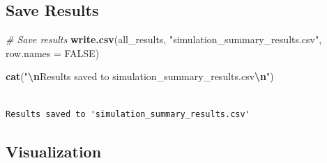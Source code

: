\documentclass[
  letterpaper,
  DIV=11,
  numbers=noendperiod]{scrartcl}
\newenvironment{Shaded}{\begin{snugshade}}{\end{snugshade}}
\newcommand{\AttributeTok}[1]{\textcolor[rgb]{0.13,0.29,0.53}{#1}}
\newcommand{\CommentTok}[1]{\textcolor[rgb]{0.56,0.35,0.01}{\textit{#1}}}
\newcommand{\ConstantTok}[1]{\textcolor[rgb]{0.56,0.35,0.01}{#1}}
\newcommand{\FunctionTok}[1]{\textcolor[rgb]{0.13,0.29,0.53}{\textbf{#1}}}
\newcommand{\NormalTok}[1]{#1}
\newcommand{\OtherTok}[1]{\textcolor[rgb]{0.56,0.35,0.01}{#1}}
\newcommand{\SpecialCharTok}[1]{\textcolor[rgb]{0.81,0.36,0.00}{\textbf{#1}}}
\newcommand{\StringTok}[1]{\textcolor[rgb]{0.31,0.60,0.02}{#1}}
\begin{document}
\begin{Shaded}
\end{Shaded}

\subsection{Save Results}\label{save-results}

\begin{Shaded}
\begin{Highlighting}[]
\CommentTok{\# Save results}
\FunctionTok{write.csv}\NormalTok{(all\_results, }\StringTok{"simulation\_summary\_results.csv"}\NormalTok{, }\AttributeTok{row.names =} \ConstantTok{FALSE}\NormalTok{)}

\FunctionTok{cat}\NormalTok{(}\StringTok{"}\SpecialCharTok{\textbackslash{}n}\StringTok{Results saved to \textquotesingle{}simulation\_summary\_results.csv\textquotesingle{}}\SpecialCharTok{\textbackslash{}n}\StringTok{"}\NormalTok{)}
\end{Highlighting}
\end{Shaded}

\begin{verbatim}

Results saved to 'simulation_summary_results.csv'
\end{verbatim}

\subsection{Visualization}\label{visualization}
\end{document}
